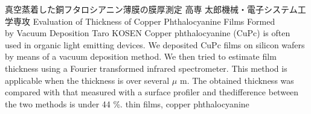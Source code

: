 
\titleAndAbstractAndKeywords
{真空蒸着した銅フタロシアニン薄膜の膜厚測定}
{高専 太郎}{機械・電子システム工学専攻}
{Evaluation of Thickness of Copper Phthalocyanine Films Formed \\ by Vacuum Deposition}
{Taro KOSEN}
{
    Copper phthalocyanine (CuPc) is often used in organic light emitting devices.
    We deposited CuPc films on silicon wafers by means of a vacuum deposition method.
    We then tried to estimate film thickness using a Fourier transformed infrared spectrometer.
    This method is applicable when the thickness is over several $\mu$ m.
    The obtained thickness was compared with that measured with a surface profiler and thedifference between the two methods is under 44 \%.
}
{thin films, copper phthalocyanine}
